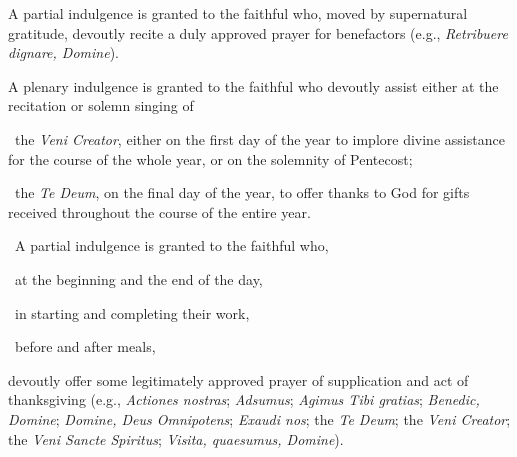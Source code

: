 \documentclass[12pt]{article}
\newcommand{\foreign}[1]{\textsl{#1}}
\begin{document}
\hypertarget{grant24}{}
A partial indulgence is granted to the faithful who, moved by supernatural gratitude, devoutly recite a duly approved prayer for benefactors (e.g., \foreign{Retribuere dignare, Domine}).

\hypertarget{grant26}{}
 A plenary indulgence is granted to the faithful who devoutly assist either at the recitation or solemn singing of

 the \foreign{Veni Creator}, either on the first day of the year to implore divine assistance for the course of the whole year, or on the solemnity of Pentecost;

 the \foreign{Te Deum}, on the final day of the year, to offer thanks to God for gifts received throughout the course of the entire year.

 A partial indulgence is granted to the faithful who,

 at the beginning and the end of the day,

 in starting and completing their work,

 before and after meals,

devoutly offer some legitimately approved prayer of supplication and act of thanksgiving (e.g., \foreign{Actiones nostras}; \foreign{Adsumus}; \foreign{Agimus Tibi gratias}; \foreign{Benedic, Domine}; \foreign{Domine, Deus Omnipotens}; \foreign{Exaudi nos}; the \foreign{Te Deum}; the \foreign{Veni Creator}; the \foreign{Veni Sancte Spiritus}; \foreign{Visita, quaesumus, Domine}).
\end{document}
